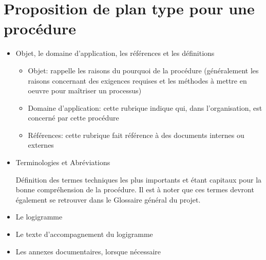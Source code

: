 \documentclass[a4paper]{article}
\begin{document}
\section{Proposition de plan type pour une procédure}

\begin{itemize}
\item Objet, le domaine d'application, les références et les définitions

\begin{itemize}
\item Objet: rappelle les raisons du pourquoi de la procédure (généralement les raisons concernant des exigences requises et les méthodes à mettre en oeuvre pour maîtriser un processus)
\item Domaine d'application: cette rubrique indique qui, dans l'organisation, est concerné par cette procédure
\item Références: cette rubrique fait référence à des documents internes ou externes
\end{itemize}

\item Terminologies et Abréviations

Définition des termes techniques les plus importants et étant capitaux pour la bonne compréhension de la procédure. Il est à noter que ces termes devront également se retrouver dans le Glossaire général du projet.

\item Le logigramme
\item Le texte d'accompagnement du logigramme
\item Les annexes documentaires, lorsque nécessaire
\end{itemize}
\end{document}
